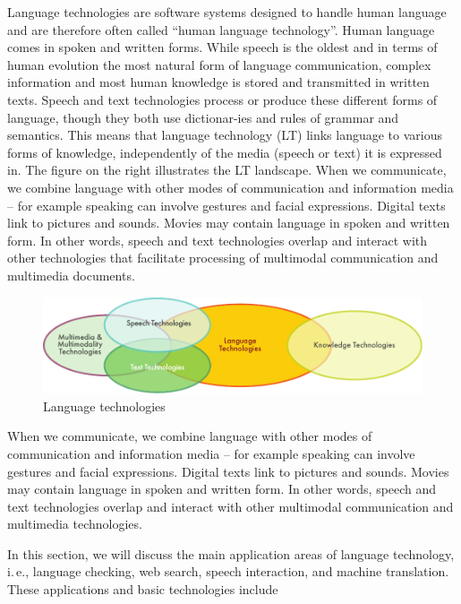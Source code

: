 \begin{multicols}{2}

Language technologies are software systems designed to handle human language and are therefore often called “human language technology”. Human language comes in spoken and written forms. While speech is the oldest and in terms of human evolution the most natural form of language communication, complex information and most human knowledge is stored and transmitted in written texts. Speech and text technologies process or produce these different forms of language, though they both use dictionar-ies and rules of grammar and semantics. This means that language technology (LT) links language to various forms of knowledge, independently of the media (speech or text) it is expressed in. The figure on the right illustrates the LT landscape. When we communicate, we combine language with other modes of communication and information media -- for example speaking can involve gestures and facial expressions. Digital texts link to pictures and sounds. Movies may contain language in spoken and written form. In other words, speech and text technologies overlap and interact with other technologies that facilitate processing of multimodal communication and multimedia documents. 

\begin{figure}[htb]
  \center
  \includegraphics[width=\textwidth]{../_media/english/language_technologies}
  \caption{Language technologies}
\label{fig:ltincontext_en}
\end{figure}

When we communicate, we combine language with other modes of communication and information media -- for example speaking can involve gestures and facial expressions. Digital texts link to pictures and sounds. Movies may contain language in spoken and written form. In other words, speech and text technologies overlap and interact with other multimodal communication and multimedia technologies.

In this section, we will discuss the main application areas of language technology, i.\,e., language checking, web search, speech interaction, and machine translation. These applications and basic technologies include 


\end{multicols}
